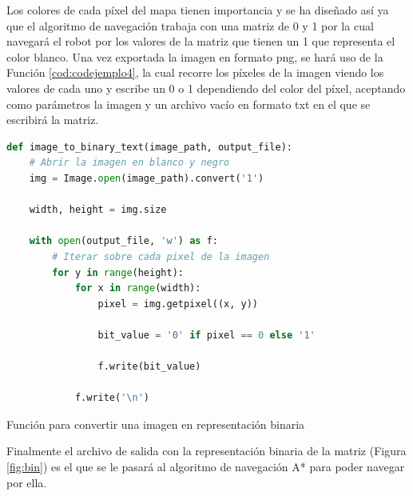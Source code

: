 Los colores de cada píxel del mapa tienen importancia y se ha diseñado así ya que el algoritmo de navegación trabaja con una matriz de 0 y 1 por la cual navegará el robot por los valores de la matriz que tienen un 1 que representa el color blanco. Una vez exportada la imagen en formato png, se hará uso de la Función \ref{cod:codejemplo4}, la cual recorre los píxeles de la imagen viendo los valores de cada uno y escribe un 0 o 1 dependiendo del color del píxel, aceptando como parámetros la imagen y un archivo vacío en formato txt en el que se escribirá la matriz.

\begin{code}[H]
\begin{lstlisting}[language=Python]
def image_to_binary_text(image_path, output_file):
    # Abrir la imagen en blanco y negro
    img = Image.open(image_path).convert('1') 

    width, height = img.size
   
    with open(output_file, 'w') as f:
        # Iterar sobre cada pixel de la imagen
        for y in range(height):
            for x in range(width):
                pixel = img.getpixel((x, y))

                bit_value = '0' if pixel == 0 else '1'

                f.write(bit_value)

            f.write('\n') 
\end{lstlisting}
\caption[Función para convertir una imagen en representación binaria ]{Función para convertir una imagen en representación binaria}
\label{cod:codejemplo4}
\end{code}

Finalmente el archivo de salida con la representación binaria de la matriz (Figura \ref{fig:bin}) es el que se le pasará al algoritmo de navegación A* para poder navegar por ella. 

